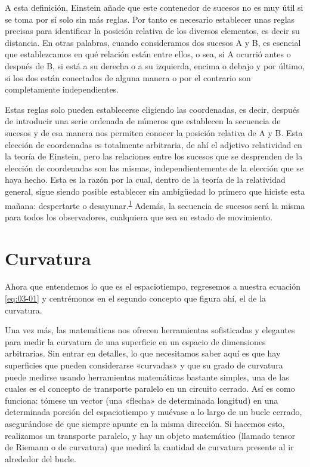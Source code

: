 A esta definición, Einstein añade que este contenedor de sucesos no es muy útil si se toma por
sí solo sin más reglas. Por tanto es necesario establecer unas reglas precisas para identificar
la posición relativa de los diversos elementos, es decir su distancia. En otras palabras,
cuando consideramos dos sucesos A y B, es esencial que establezcamos en qué relación están
entre ellos, o sea, si A ocurrió antes o después de B, si está a su derecha o a su izquierda,
encima o debajo y por último, si los dos están conectados de alguna manera o por el contrario
son completamente independientes.

Estas reglas solo pueden establecerse eligiendo las coordenadas, es decir, después de
introducir una serie ordenada de números que establecen la secuencia de sucesos y de esa manera
nos permiten conocer la posición relativa de A y B. Esta elección de coordenadas es totalmente
arbitraria, de ahí el adjetivo relatividad en la teoría de Einstein, pero las relaciones entre
los sucesos que se desprenden de la elección de coordenadas son las mismas, independientemente
de la elección que se haya hecho. Esta es la razón por la cual, dentro de la teoría de la
relatividad general, sigue siendo posible establecer sin ambigüedad lo primero que hiciste esta
mañana: despertarte o desayunar.\textsuperscript{\hyperlink{note:03-01}{1}} Además, la
secuencia de sucesos será la misma para todos los observadores, cualquiera que sea su estado de
movimiento.

\section{Curvatura}\label{sec:03-curvature}

Ahora que entendemos lo que es el espaciotiempo, regresemos a nuestra ecuación \eqref{eq:03-01}
y centrémonos en el segundo concepto que figura ahí, el de la curvatura.

Una vez más, las matemáticas nos ofrecen herramientas sofisticadas y elegantes para medir la
curvatura de una superficie en un espacio de dimensiones arbitrarias. Sin entrar en detalles,
lo que necesitamos saber aquí es que hay superficies que pueden considerarse «curvadas» y que
su grado de curvatura puede medirse usando herramientas matemáticas bastante simples, una de
las cuales es el concepto de transporte paralelo en un circuito cerrado. Así es como funciona:
tómese un vector (una «flecha» de determinada longitud) en una determinada porción del
espaciotiempo y muévase a lo largo de un bucle cerrado, asegurándose de que siempre apunte en
la misma dirección. Si hacemos esto, realizamos un transporte paralelo, y hay un objeto
matemático (llamado tensor de Riemann o de curvatura) que medirá la cantidad de curvatura
presente al ir alrededor del bucle.

